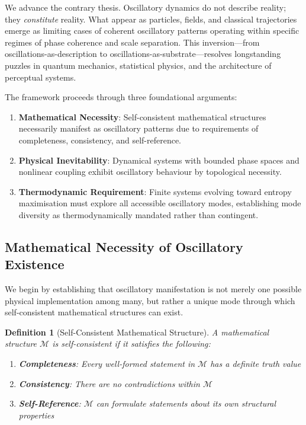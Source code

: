 \documentclass[12pt,a4paper]{article}
\newtheorem{definition}{Definition}
\begin{document}
We advance the contrary thesis. Oscillatory dynamics do not describe reality; they \textit{constitute} reality. What appear as particles, fields, and classical trajectories emerge as limiting cases of coherent oscillatory patterns operating within specific regimes of phase coherence and scale separation. This inversion—from oscillations-as-description to oscillations-as-substrate—resolves longstanding puzzles in quantum mechanics, statistical physics, and the architecture of perceptual systems.

The framework proceeds through three foundational arguments:

\begin{enumerate}
\item \textbf{Mathematical Necessity}: Self-consistent mathematical structures necessarily manifest as oscillatory patterns due to requirements of completeness, consistency, and self-reference.

\item \textbf{Physical Inevitability}: Dynamical systems with bounded phase spaces and nonlinear coupling exhibit oscillatory behaviour by topological necessity.

\item \textbf{Thermodynamic Requirement}: Finite systems evolving toward entropy maximisation must explore all accessible oscillatory modes, establishing mode diversity as thermodynamically mandated rather than contingent.
\end{enumerate}

\subsection{Mathematical Necessity of Oscillatory Existence}

We begin by establishing that oscillatory manifestation is not merely one possible physical implementation among many, but rather a unique mode through which self-consistent mathematical structures can exist.

\begin{definition}[Self-Consistent Mathematical Structure]
A mathematical structure $\mathcal{M}$ is self-consistent if it satisfies the following:
\begin{enumerate}
\item \textbf{Completeness}: Every well-formed statement in $\mathcal{M}$ has a definite truth value
\item \textbf{Consistency}: There are no contradictions within $\mathcal{M}$
\item \textbf{Self-Reference}: $\mathcal{M}$ can formulate statements about its own structural properties
\end{enumerate}
\end{definition}
\end{document}
